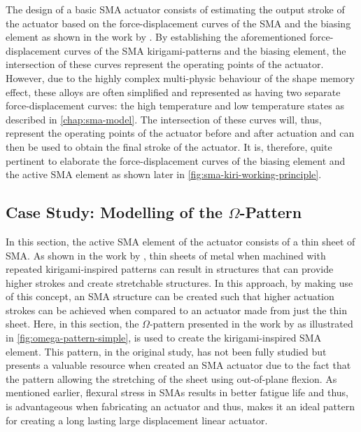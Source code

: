 The design of a basic SMA actuator consists of estimating the output stroke of the actuator based on the force-displacement curves of the SMA and the biasing element as shown in the work by \cite{dragoniDesignDevelopmentAdvanced2021}. By establishing the aforementioned force-displacement curves of the SMA kirigami-patterns and the biasing element, the intersection of these curves represent the operating points of the actuator. However, due to the highly complex multi-physic behaviour of the shape memory effect, these alloys are often simplified and represented as having two separate force-displacement curves: the high temperature and low temperature states as described in \cref{chap:sma-model}. The intersection of these curves will, thus, represent the operating points of the actuator before and after actuation and can then be used to obtain the final stroke of the actuator. It is, therefore, quite pertinent to elaborate the force-displacement curves of the biasing element and the active SMA element as shown later in \cref{fig:sma-kiri-working-principle}.

\subsection{Case Study: Modelling of the $\Omega$-Pattern}
In this section, the active SMA element of the actuator consists of a thin sheet of SMA. As shown in the work by \cite{morikawaUltrastretchableKirigamiBioprobes2018}, thin sheets of metal when machined with repeated kirigami-inspired patterns can result in structures that can provide higher strokes and create stretchable structures. In this approach, by making use of this concept, an SMA structure can be created such that higher actuation strokes can be achieved when compared to an actuator made from just the thin sheet. Here, in this section, the $\Omega$-pattern presented in the work by \cite{shyuKirigamiApproachEngineering2015} as illustrated in \cref{fig:omega-pattern-simple}, is used to create the kirigami-inspired SMA element. This pattern, in the original study, has not been fully studied but presents a valuable resource when created an SMA actuator due to the fact that the pattern allowing the stretching of the sheet using out-of-plane flexion. As mentioned earlier, flexural stress in SMAs results in better fatigue life and thus, is advantageous when fabricating an actuator and thus, makes it an ideal pattern for creating a long lasting large displacement linear actuator.

